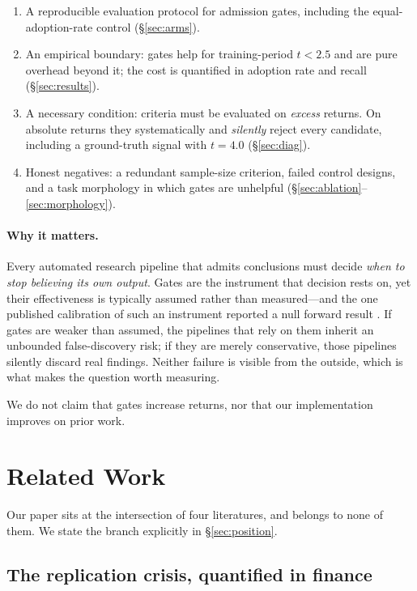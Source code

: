 \documentclass[11pt]{article}
\begin{document}
\begin{enumerate}\itemsep1pt
\item A reproducible evaluation protocol for admission gates, including the equal-adoption-rate
      control (\S\ref{sec:arms}).
\item An empirical boundary: gates help for training-period $t<2.5$ and are pure overhead
      beyond it; the cost is quantified in adoption rate and recall (\S\ref{sec:results}).
\item A necessary condition: criteria must be evaluated on \emph{excess} returns. On absolute
      returns they systematically and \emph{silently} reject every candidate, including a
      ground-truth signal with $t=4.0$ (\S\ref{sec:diag}).
\item Honest negatives: a redundant sample-size criterion, failed control designs, and a task
      morphology in which gates are unhelpful (\S\ref{sec:ablation}--\ref{sec:morphology}).
\end{enumerate}

\paragraph{Why it matters.} Every automated research pipeline that admits conclusions must
decide \emph{when to stop believing its own output}. Gates are the instrument that decision rests
on, yet their effectiveness is typically assumed rather than measured---and the one published
calibration of such an instrument reported a null forward result \citep{minerva}. If gates are
weaker than assumed, the pipelines that rely on them inherit an unbounded false-discovery risk;
if they are merely conservative, those pipelines silently discard real findings. Neither failure
is visible from the outside, which is what makes the question worth measuring.

We do not claim that gates increase returns, nor that our implementation improves on prior work.

\section{Related Work}
\label{sec:related}

Our paper sits at the intersection of four literatures, and belongs to none of them. We state
the branch explicitly in \S\ref{sec:position}.

\subsection{The replication crisis, quantified in finance}
\end{document}

